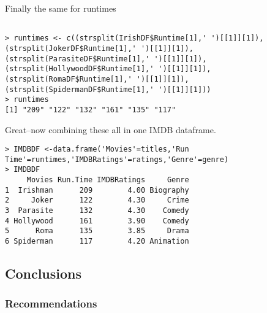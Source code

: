 \documentclass[
]{article}
\begin{document}
Finally the same for runtimes

\begin{verbatim}

> runtimes <- c((strsplit(IrishDF$Runtime[1],' ')[[1]][1]),(strsplit(JokerDF$Runtime[1],' ')[[1]][1]),(strsplit(ParasiteDF$Runtime[1],' ')[[1]][1]),(strsplit(HollywoodDF$Runtime[1],' ')[[1]][1]),(strsplit(RomaDF$Runtime[1],' ')[[1]][1]),(strsplit(SpidermanDF$Runtime[1],' ')[[1]][1]))
> runtimes
[1] "209" "122" "132" "161" "135" "117"
\end{verbatim}

Great--now combining these all in one IMDB dataframe.

\begin{verbatim}
> IMDBDF <-data.frame('Movies'=titles,'Run Time'=runtimes,'IMDBRatings'=ratings,'Genre'=genre)
> IMDBDF
     Movies Run.Time IMDBRatings     Genre
1  Irishman      209        4.00 Biography
2     Joker      122        4.30     Crime
3  Parasite      132        4.30    Comedy
4 Hollywood      161        3.90    Comedy
5      Roma      135        3.85     Drama
6 Spiderman      117        4.20 Animation
\end{verbatim}

\hypertarget{conclusions}{%
\subsection{Conclusions}\label{conclusions}}

\hypertarget{recommendations}{%
\subsubsection{Recommendations}\label{recommendations}}
\end{document}
